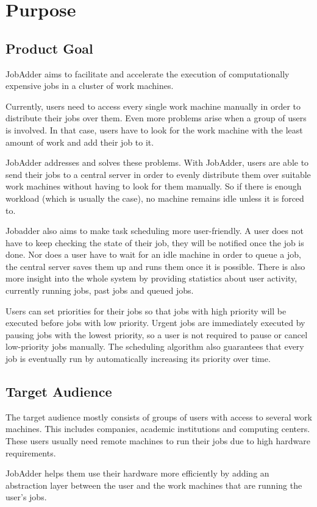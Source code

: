 \section{Purpose}
  \subsection{Product Goal}
    JobAdder aims to facilitate and accelerate the execution of computationally
    expensive jobs in a cluster of work machines.

    Currently, users need to access every single work machine manually in order to
    distribute their jobs over them. Even more problems arise when a group of users
    is involved. In that case, users have to look for the work machine with the
    least amount of work and add their job to it.

    JobAdder addresses and solves these problems. With JobAdder, users are able to
    send their jobs to a central server in order to evenly distribute them over
    suitable work machines without having to look for them manually. So if there is
    enough workload (which is usually the case), no machine remains idle unless it
    is forced to.

    Jobadder also aims to make task scheduling more user-friendly. A user does not
    have to keep checking the state of their job, they will be notified once the job
    is done. Nor does a user have to wait for an idle machine in order to queue a
    job, the central server saves them up and runs them once it is possible. There
    is also more insight into the whole system by providing statistics about user
    activity, currently running jobs, past jobs and queued jobs.

    Users can set priorities for their jobs so that jobs with high priority will be
    executed before jobs with low priority. Urgent jobs are immediately executed by
    pausing jobs with the lowest priority, so a user is not required to pause or
    cancel low-priority jobs manually. The scheduling algorithm also guarantees that
    every job is eventually run by automatically increasing its priority over time.

  \subsection{Target Audience}
    The target audience mostly consists of groups of users with access to several
    work machines. This includes companies, academic institutions and computing
    centers. These users usually need remote machines to run their jobs due to high
    hardware requirements.

    JobAdder helps them use their hardware more efficiently by adding an abstraction
    layer between the user and the work machines that are running the user's jobs.
